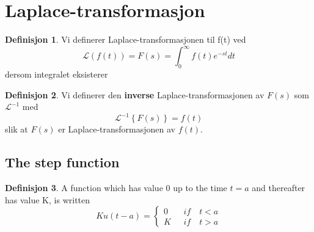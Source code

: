 \documentclass[11pt]{article}
\theoremstyle{definition}
\newtheorem{mindef}{Definisjon}[section]
\newenvironment{fmindef}
{\begin{mdframed}[style=minstil]\begin{mindef}}
		{\end{mindef}\end{mdframed}}
\theoremstyle{definition}
\theoremstyle{definition}
\theoremstyle{definition}
\theoremstyle{definition}
\theoremstyle{definition}
\begin{document}
		
	
		\newpage
		
		\section{Laplace-transformasjon}
		
		
		\begin{fmindef}
			Vi definerer Laplace-transformasjonen til f(t) ved 
			\begin{equation}
			\mathscr{L}(f(t))=F(s)=\int_0^{\infty}f(t)e^{-st}dt
			\end{equation}	
			dersom integralet eksisterer
		\end{fmindef}
		
		\begin{fmindef}
			Vi definerer den \textbf{inverse} Laplace-transformasjonen av \(F(s)\) som \(\mathscr{L}^{-1} \) med \[\mathscr{L}^{-1}\left\lbrace F(s) \right\rbrace=f(t)  \]
			slik at \(F(s)\) er Laplace-transformasjonen av \(f(t)\).
		\end{fmindef}
		
		\newpage
		
		\subsection{The step function}
		
		\begin{fmindef}
			A function which has value 0 up to the time \(t=a\) and thereafter has value K, is written
			\[
			Ku(t-a)=
			\begin{cases}
			0 \hspace{8pt} &if \hspace{12pt} t<a \\
			K \hspace{8pt} &if \hspace{12pt} t>a 
			\end{cases}
			\]
		\end{fmindef}
		
\end{document}
